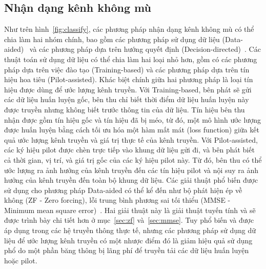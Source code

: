 \subsection{Nhận dạng kênh không mù}
Như trên hình~\ref{fig:classify}, các phương pháp nhận dạng kênh không mù có thể chia làm hai nhóm chính, bao gồm các phương pháp sử dụng dữ liệu (Data-aided)~\cite{vilas2022} và các phương pháp dựa trên hướng quyết định (Decision-directed)~\cite{Ozdemir2007}. Các thuật toán sử dụng dữ liệu có thể chia làm hai loại nhỏ hơn, gồm có các phương pháp dựa trên việc đào tạo (Training-based) và các phương pháp dựa trên tín hiệu hoa tiêu (Pilot-assisted). Khác biệt chính giữa hai phương pháp là loại tín hiệu được dùng để ước lượng kênh truyền. Với Training-based, bên phát sẽ gửi các dữ liệu huấn luyện gốc, bên thu chỉ biết thời điểm dữ liệu huấn luyện này được truyền nhưng không biết trước thông tin của dữ liệu. Tín hiệu bên thu nhận được gồm tín hiệu gốc và tín hiệu đã bị méo, từ đó, một mô hình ước lượng được huấn luyện bằng cách tối ưu hóa một hàm mất mát (loss function) giữa kết quả ước lượng kênh truyền và giá trị thực tế của kênh truyền. Với Pilot-assisted, các ký hiệu pilot được chèn trực tiếp vào khung dữ liệu gửi đi, và bên phát biết cả thời gian, vị trí, và giá trị gốc của các ký hiệu pilot này. Từ đó, bên thu có thể ước lượng ra ảnh hưởng của kênh truyền đến các tín hiệu pilot và nội suy ra ảnh hưởng của kênh truyền đến toàn bộ khung dữ liệu. Các giải thuật phổ biến được sử dụng cho phương pháp Data-aided có thể kể đến như bộ phát hiện ép về không (ZF - Zero forcing), lỗi trung bình phương sai tối thiểu (MMSE - Minimum mean square error)~\cite{Jiang2011}. Hai giải thuật này là giải thuật tuyến tính và sẽ được trình bày chi tiết hơn ở mục~\ref{sec:zf} và~\ref{sec:mmse}. Tuy phổ biến và được áp dụng trong các hệ truyền thông thực tế, nhưng các phương pháp sử dụng dữ liệu để ước lượng kênh truyền có một nhược điểm đó là giảm hiệu quả sử dụng phổ do một phần băng thông bị lãng phí để truyền tải các dữ liệu huấn luyện hoặc pilot. 

